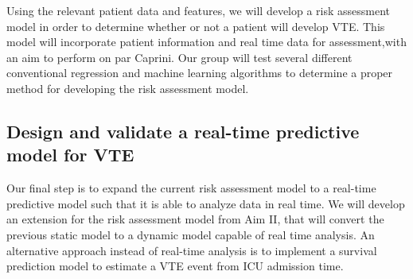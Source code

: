 \documentclass{article}
\begin{document}
Using the relevant patient data and features, we will develop a risk assessment model in order to determine whether or not a patient will develop VTE. This model will incorporate patient information and real time data for assessment,with an aim to perform on par Caprini. Our group will test several different conventional regression and machine learning algorithms to determine a proper method for developing the risk assessment model. 



\subsection{Design and validate a real-time predictive model for VTE}


Our final step is to expand the current risk assessment model to a real-time predictive model such that it is able to analyze data in real time. We will develop an extension for the risk assessment model from Aim II, that will convert the previous static model to a dynamic model capable of real time analysis. An alternative approach instead of real-time analysis is to implement a survival prediction model to estimate a VTE event from ICU admission time. 




\newpage


\end{document}

